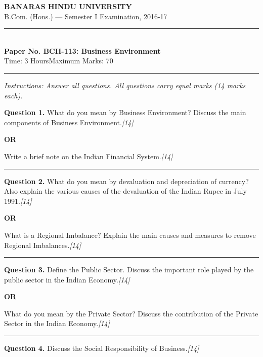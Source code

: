 \documentclass[11pt,a4paper]{article}
\newcommand{\pts}[1]{\hfill   \textit{[#1]}}
\begin{document}
\begin{center}
  {\large\bfseries BANARAS HINDU UNIVERSITY}\\[2pt]
  {\normalsize B.Com. (Hons.) --- Semester I Examination, 2016-17}\\[6pt]
  \rule{0.8\linewidth}{0.5pt}\\[6pt]
  {\large\bfseries Paper No. BCH-113: Business Environment}\\[4pt]
  {\normalsize Time: 3 Hours\hfill Maximum Marks: 70}
\end{center}

\rule{\linewidth}{0.4pt}

\smallskip



\noindent   \textit{Instructions: Answer all questions. All questions carry equal marks (14 marks each).}

\bigskip




\noindent   \textbf{Question 1.}
What do you mean by Business Environment? Discuss the main components of Business Environment.\pts{14}

\centerline{   \textbf{OR}}

Write a brief note on the Indian Financial System.\pts{14}

\medskip\rule{\linewidth}{0.2pt}




\noindent   \textbf{Question 2.}
What do you mean by devaluation and depreciation of currency? Also explain the various causes of the devaluation of the Indian Rupee in July 1991.\pts{14}

\centerline{   \textbf{OR}}

What is a Regional Imbalance? Explain the main causes and measures to remove Regional Imbalances.\pts{14}

\medskip\rule{\linewidth}{0.2pt}




\noindent   \textbf{Question 3.}
Define the Public Sector. Discuss the important role played by the public sector in the Indian Economy.\pts{14}

\centerline{   \textbf{OR}}

What do you mean by the Private Sector? Discuss the contribution of the Private Sector in the Indian Economy.\pts{14}

\medskip\rule{\linewidth}{0.2pt}




\noindent   \textbf{Question 4.}
Discuss the Social Responsibility of Business.\pts{14}
\end{document}
